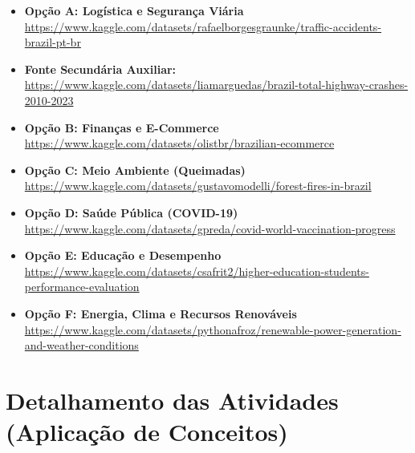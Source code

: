 \documentclass[12pt,a4paper]{article}
\begin{document}
	\begin{itemize}[leftmargin=*]
		\item \textbf{Opção A: Logística e Segurança Viária} \\
		{\footnotesize \url{https://www.kaggle.com/datasets/rafaelborgesgraunke/traffic-accidents-brazil-pt-br}}
		\item \textbf{Fonte Secundária Auxiliar:} \\
		{\footnotesize \url{https://www.kaggle.com/datasets/liamarguedas/brazil-total-highway-crashes-2010-2023}}
		
		\item \textbf{Opção B: Finanças e E-Commerce} \\
		{\footnotesize \url{https://www.kaggle.com/datasets/olistbr/brazilian-ecommerce}}
		
		\item \textbf{Opção C: Meio Ambiente (Queimadas)} \\
		{\footnotesize \url{https://www.kaggle.com/datasets/gustavomodelli/forest-fires-in-brazil}}
		
		\item \textbf{Opção D: Saúde Pública (COVID-19)} \\
		{\footnotesize \url{https://www.kaggle.com/datasets/gpreda/covid-world-vaccination-progress}}
		
		\item \textbf{Opção E: Educação e Desempenho} \\
		{\footnotesize \url{https://www.kaggle.com/datasets/csafrit2/higher-education-students-performance-evaluation}}
		
		\item \textbf{Opção F: Energia, Clima e Recursos Renováveis} \\
		{\footnotesize \url{https://www.kaggle.com/datasets/pythonafroz/renewable-power-generation-and-weather-conditions}}
	\end{itemize}
	
	\section{Detalhamento das Atividades (Aplicação de Conceitos)}
	
\end{document}
